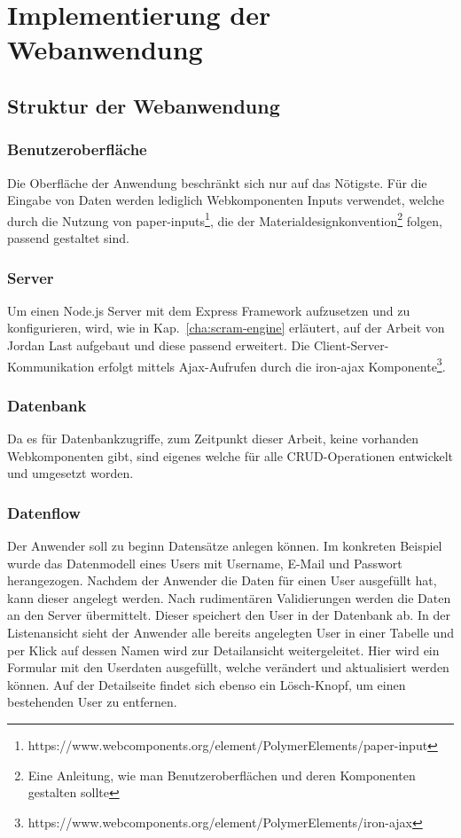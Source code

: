 \chapter{Implementierung der Webanwendung}

\section{Struktur der Webanwendung}
\subsection{Benutzeroberfläche}
Die Oberfläche der Anwendung beschränkt sich nur auf das Nötigste. Für die Eingabe von Daten werden lediglich Webkomponenten Inputs verwendet, welche durch die Nutzung von paper-inputs\footnote{https://www.webcomponents.org/element/PolymerElements/paper-input}, die der Materialdesignkonvention\footnote{Eine Anleitung, wie man Benutzeroberflächen und deren Komponenten gestalten sollte} folgen, passend gestaltet sind.

\subsection{Server}
Um einen Node.js Server mit dem Express Framework aufzusetzen und zu konfigurieren, wird, wie in Kap.~\ref{cha:scram-engine} erläutert, auf der Arbeit von Jordan Last aufgebaut und diese passend erweitert. 
Die Client-Server-Kommunikation erfolgt mittels Ajax-Aufrufen durch die iron-ajax Komponente\footnote{https://www.webcomponents.org/element/PolymerElements/iron-ajax}.
\subsection{Datenbank}
Da es für Datenbankzugriffe, zum Zeitpunkt dieser Arbeit, keine vorhanden Webkomponenten gibt, sind eigenes welche für alle CRUD-Operationen entwickelt und umgesetzt worden.

\subsection{Datenflow}
Der Anwender soll zu beginn Datensätze anlegen können. Im konkreten Beispiel wurde das Datenmodell eines Users mit Username, E-Mail und Passwort herangezogen.
Nachdem der Anwender die Daten für einen User ausgefüllt hat, kann dieser angelegt werden. Nach rudimentären Validierungen werden die Daten an den Server übermittelt. Dieser speichert den User in der Datenbank ab. 
In der Listenansicht sieht der Anwender alle bereits angelegten User in einer Tabelle und per Klick auf dessen Namen wird zur Detailansicht weitergeleitet. Hier wird ein Formular mit den Userdaten ausgefüllt, welche verändert und aktualisiert werden können.   
Auf der Detailseite findet sich ebenso ein Lösch-Knopf, um einen bestehenden User zu entfernen.
